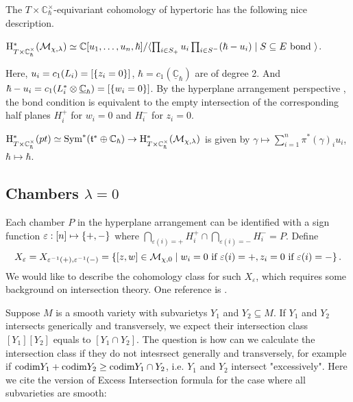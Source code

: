 \documentclass[b5paper]{article}
\newcommand{\mathintitle}[1]{\texorpdfstring{$#1$}{\detokenize{#1}}}
\newcommand{\MM}{\mathcal{M}}
\newcommand{\HH}{\mathrm{H}}
\newcommand{\Chbar}{\mathbb{C}^\times _\hbar}
\begin{document}
The $T\times \Chbar$-equivariant cohomology of hypertoric has the following nice description.
\begin{theorem}{\cite{konno2001equivariant}}
    $\HH^*_{T\times \Chbar}(\MM_{\chi,\lambda})\simeq \mathbb{C}[u_1,\dots ,u_n,\hbar]/\AB{\prod_{i\in S_+}^{}u_i\prod_{i\in S^-}^{}(\hbar-u_i)\mid S\subseteq E\textnormal{ bond }}$.
\begin{remark}
    Here, 
    $u_i=c_1(L_i)=[\left\{z_i=0\right\}]$, $\hbar=c_1(\underline{\mathbb{C}}_\hbar)$ are of degree 2. And $\hbar-u_i=c_1(L_i^*\otimes\underline{\mathbb{C}}_\hbar)=[\left\{w_i=0\right\}]$. By the hyperplane arrangement perspective , the bond condition is equivalent to the empty intersection of the corresponding half planes $H^+_i$ for $w_i=0$ and $H^-_i$ for $z_i=0$.
\end{remark}
\begin{remark}
    $\HH^*_{T\times \Chbar}(pt)\simeq \textnormal{Sym}^*(\mathfrak{t}^*\oplus\mathbb{C}_\hbar)\rightarrow \HH^*_{T\times \Chbar}(\MM_{\chi,\lambda})$ is given by $\gamma\mapsto \sum_{i=1}^{n}\pi^*(\gamma)_iu_i$, $\hbar\mapsto \hbar$.
\end{remark}
\end{theorem}

\subsection{Chambers \mathintitle{\lambda=0}}

Each chamber $P$ in the hyperplane arrangement can be identified with a sign function $\varepsilon: [n]\mapsto \left\{+,-\right\}$ where $\bigcap_{\varepsilon(i)=+}H_i^+\cap \bigcap_{\varepsilon(i)=-}H_i^-=P $.
Define 
\[
    X_{\varepsilon}=X_{\varepsilon^{-1}(+),\varepsilon^{-1}(-)}=\CB{[z,w]\in \MM_{\chi,0} \mid w_i=0\textnormal{ if }\varepsilon(i)=+, z_i=0\textnormal{ if }\varepsilon(i)=-}.
\]
We would like to describe the cohomology class for such $X_\varepsilon$, which requires some background on intersection theory. One reference is \cite{eisenbud20163264}.

Suppose $M$ is a smooth variety with subvarietys $Y_1$ and $Y_2\subseteq M$.
If $Y_1$ and $Y_2$ intersects generically and transversely, we expect their intersection class $[Y_1][Y_2]$ equals to $[Y_1\cap Y_2]$. The question is how can we calculate the intersection class if they do not intesrsect generally and transversely, for example if $\textnormal{codim} Y_1+\textnormal{codim} Y_2\geq \textnormal{codim} Y_1\cap Y_2$, i.e. $Y_1$ and $Y_2$ intersect "excessively".
Here we cite the version of Excess Intersection formula for the case where all subvarieties are smooth:
\end{document}
